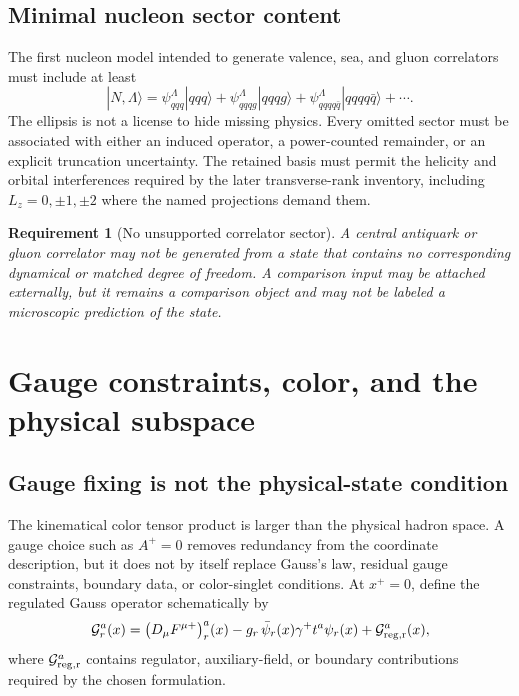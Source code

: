 \documentclass[11pt]{article}
\newtheorem{requirement}[definition]{Requirement}
\newcommand{\cG}{\mathcal G}
\begin{document}
\subsection{Minimal nucleon sector content}

The first nucleon model intended to generate valence, sea, and gluon
correlators must include at least
\begin{equation}
 |N,\Lambda\rangle
 =\psi_{qqq}^{\Lambda}|qqq\rangle
 +\psi_{qqqg}^{\Lambda}|qqqg\rangle
 +\psi_{qqqq\bar q}^{\Lambda}|qqqq\bar q\rangle
 +\cdots.
\label{eq:minimal-nucleon-fock}
\end{equation}
The ellipsis is not a license to hide missing physics.  Every omitted sector
must be associated with either an induced operator, a power-counted remainder,
or an explicit truncation uncertainty.  The retained basis must permit the
helicity and orbital interferences required by the later transverse-rank
inventory, including \(L_z=0,\pm1,\pm2\) where the named projections demand
them.

\begin{requirement}[No unsupported correlator sector]
\label{req:no-unsupported-sector}
A central antiquark or gluon correlator may not be generated from a state that
contains no corresponding dynamical or matched degree of freedom.  A
comparison input may be attached externally, but it remains a comparison
object and may not be labeled a microscopic prediction of the state.
\end{requirement}

\section{Gauge constraints, color, and the physical subspace}
\label{sec:gauge}

\subsection{Gauge fixing is not the physical-state condition}

The kinematical color tensor product is larger than the physical hadron
space.  A gauge choice such as \(A^+=0\) removes redundancy from the
coordinate description, but it does not by itself replace Gauss's law,
residual gauge constraints, boundary data, or color-singlet conditions.  At
\(x^+=0\), define the regulated Gauss operator schematically by
\begin{equation}
 \cG_r^a(x)
 =\bigl(D_\mu F^{\mu +}\bigr)^a_r(x)
 -g_r\,\bar\psi_r(x)\gamma^+t^a\psi_r(x)
 +\cG_{\rm reg,r}^a(x),
\label{eq:gauss-operator}
\end{equation}
where \(\cG_{\rm reg,r}^a\) contains regulator, auxiliary-field, or boundary
contributions required by the chosen formulation.
\end{document}
